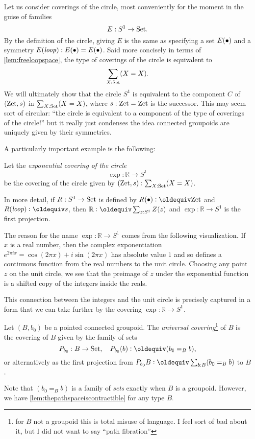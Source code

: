 \begin{remark}
  \label{xca:coveringsofS1}
  Let us consider coverings of the circle, most conveniently for the moment in the guise of families 
$$E:S^1\to\mathord{\mathrm{Set}}.$$
By the definition of the circle, giving $E$ is the same as specifying a set $E(\bullet)$ and a symmetry $E(\mathit{loop}):E(\bullet)=E(\bullet)$.  Said more concisely in terms of \cref{lem:freeloopspace}, the type of coverings of the circle is equivalent to 
$$\sum_{X:\mathord{\mathrm{Set}}}(X=X).$$
We will ultimately show that the circle $S^1$ is equivalent to the component $C$ of $(\mathrm{Zet},s)$ in $\sum_{X:\mathord{\mathrm{Set}}}(X=X)$,  where $s:\mathrm{Zet}=\mathrm{Zet}$ is the successor.  This may seem sort of circular: ``the circle is equivalent to a component of the type of coverings of the circle!'' but it really just condenses the idea connected groupoids are uniquely given by their symmetries.
\end{remark}
A particularly important example is the following:
\begin{definition}
  \label{def:RtoS1}
  Let the \emph{exponential covering of the circle}
$$\exp:\mathbb R\to S^1$$ 
be the covering of the circle given by $(\mathrm{Zet},s):\sum_{X:\mathord{\mathrm{Set}}}(X=X)$.  
\end{definition}

In more detail, if $R:S^1\to\mathord{\mathrm{Set}}$ is defined by $R(\base)\defequi\zet$ and $R(\Sloop)\defequi s$, then $\mathbb R\defequi\sum_{z:S^1}Z(z)$ and $\exp:\mathbb R\to S^1$ is the first projection.

\begin{remark}
  \label{rem:expforreal}
  The reason for the name $\exp:\mathbb R\to S^1$ comes from the following visualization.  
If $x$ is a real number, then the complex exponentiation $e^{2\pi i x}=\cos(2\pi x)+i\sin(2\pi x)$ has absolute value $1$ and so defines a continuous function from the real numbers to the unit circle.  
Choosing any point $z$ on the unit circle, we see that the preimage of $z$ under the exponential function is a shifted copy of the integers inside the reals. 
 
This connection between the integers and the unit circle is precisely captured in a form that we can take further by the covering $\exp:\mathbb R\to S^1$.
\end{remark}

\begin{definition}
  \label{def:universalcover}
  Let $(B,b_0)$ be a pointed connected groupoid.  
The \emph{universal covering}\footnote{for $B$ not a groupoid this is total misuse of language.  I feel sort of bad about it, but I did not want to say ``path fibration''} of $B$ is the covering of $B$ given by the family of sets 
  $$P_{b_0}:B\to\Set,\quad P_{b_0}(b)\defequi (b_0=_Bb),$$
or alternatively as the first projection from $P_{b_0}B\defequi\sum_{b:B}(b_0=_Bb)$ to $B$. 
\end{definition}
Note that $(b_0=_B b)$ is a family of \emph{sets} exactly when $B$ is a groupoid. 
However, we have \cref{lem:thepathspaceiscontractible} for any type $B$.

